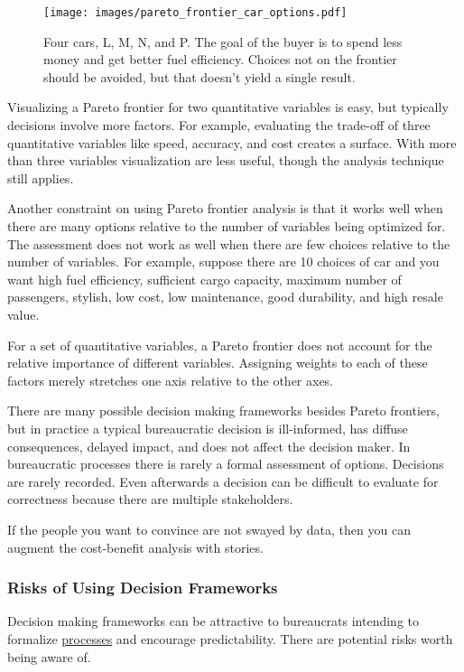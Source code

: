 \begin{figure}[ht]
    \centering
    \texttt{[image: images/pareto\_frontier\_car\_options.pdf]}
    \caption{Four cars, L, M, N, and P. The goal of the buyer is to spend less money and get better fuel efficiency. Choices not on the frontier should be avoided, but that doesn't yield a single result.}
    \label{fig:pareto_frontier_cars}
\end{figure}

Visualizing a Pareto frontier for two quantitative variables is easy, but typically decisions involve more factors. For example, evaluating the trade-off of three quantitative variables like speed, accuracy, and cost creates a surface. With more than three variables visualization are less useful, though the analysis technique still applies. 

Another constraint on using Pareto frontier analysis is that it works well when there are many options relative to the number of variables being optimized for. 
The assessment does not work as well when there are few choices relative to the number of variables. For example, suppose there are 10 choices of car and you want high fuel efficiency, sufficient cargo capacity, maximum number of passengers, stylish, low cost, low maintenance, good durability, and high resale value. 

For a set of quantitative variables, a Pareto frontier does not account for the relative importance of different variables. Assigning weights to each of these factors merely stretches one axis relative to the other axes. 

There are many possible decision making frameworks besides Pareto frontiers, but in practice a typical bureaucratic decision is ill-informed, has diffuse consequences, delayed impact, and does not affect the decision maker. In bureaucratic processes there is rarely a formal assessment of options. 
Decisions are rarely recorded. 
Even afterwards a decision can be difficult to evaluate for correctness because there are multiple stakeholders.

If the people you want to convince are not swayed by data, then you can augment the cost-benefit analysis with stories. 

\subsubsection{Risks of Using Decision Frameworks}

Decision making frameworks can be attractive to bureaucrats intending to formalize 
\hyperref[sec:process]{processes} 
and encourage predictability. There are potential risks worth being aware of. 


